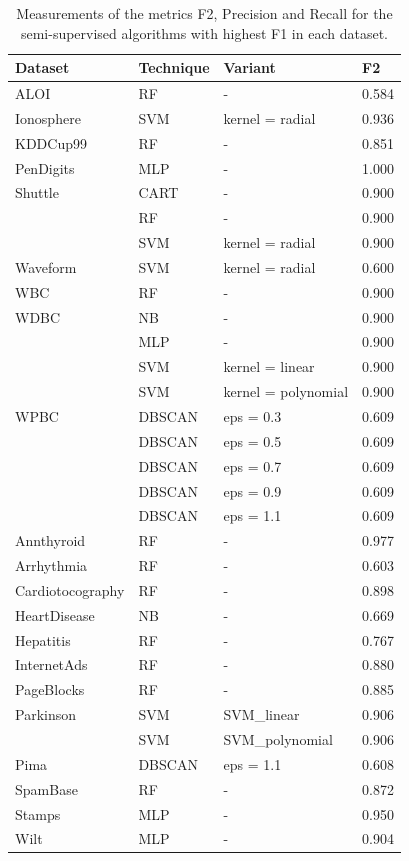 \begin{table}[!ht]
	\centering
	\caption{Measurements of the metrics F2, Precision and Recall for the semi-supervised algorithms with highest F1 in each dataset.}
	\label{tab:best_algs_f20}
	\begin{tabular}{@{}llll@{}}
		\toprule
		\textbf{Dataset} & \textbf{Technique} & \textbf{Variant} & \textbf{F2} \\ \midrule
		ALOI & RF & - & 0.584 \\
		Ionosphere & SVM & kernel = radial & 0.936 \\
		KDDCup99 & RF & - & 0.851 \\
		PenDigits & MLP & - & 1.000 \\
		Shuttle & CART & - & 0.900 \\
		& RF & - & 0.900 \\
		& SVM & kernel = radial & 0.900 \\
		Waveform & SVM & kernel = radial & 0.600 \\
		WBC & RF & - & 0.900 \\
		WDBC & NB & - & 0.900 \\
		& MLP & - & 0.900 \\
		& SVM & kernel = linear & 0.900 \\
		& SVM & kernel = polynomial & 0.900 \\
		WPBC & DBSCAN & eps = 0.3 & 0.609 \\
		& DBSCAN & eps = 0.5 & 0.609 \\
		& DBSCAN & eps = 0.7 & 0.609 \\
		& DBSCAN & eps = 0.9 & 0.609 \\
		& DBSCAN & eps = 1.1 & 0.609 \\
		Annthyroid & RF & - & 0.977 \\
		Arrhythmia & RF & - & 0.603 \\
		Cardiotocography & RF & - & 0.898 \\
		HeartDisease & NB & - & 0.669 \\
		Hepatitis & RF & - & 0.767 \\
		InternetAds & RF & - & 0.880 \\
		PageBlocks & RF & - & 0.885 \\
		Parkinson & SVM & SVM\_linear & 0.906 \\
		& SVM & SVM\_polynomial & 0.906 \\
		Pima & DBSCAN & eps = 1.1 & 0.608 \\
		SpamBase & RF & - & 0.872 \\
		Stamps & MLP & - & 0.950 \\
		Wilt & MLP & - & 0.904 \\ \bottomrule
	\end{tabular}
\end{table}

